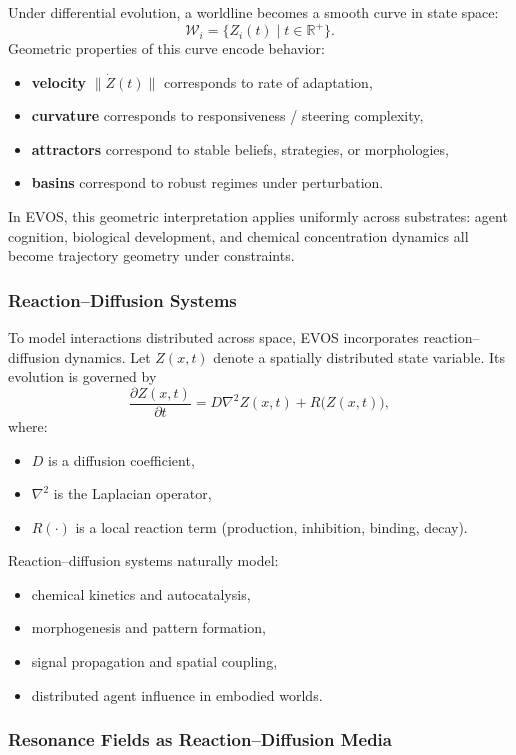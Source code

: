 \documentclass[11pt]{article}
\begin{document}
Under differential evolution, a worldline becomes a smooth curve in state space:
\[
\mathcal{W}_i = \{ Z_i(t) \mid t \in \mathbb{R}^+ \}.
\]
Geometric properties of this curve encode behavior:
\begin{itemize}
  \item \textbf{velocity} $\|\dot{Z}(t)\|$ corresponds to rate of adaptation,
  \item \textbf{curvature} corresponds to responsiveness / steering complexity,
  \item \textbf{attractors} correspond to stable beliefs, strategies, or morphologies,
  \item \textbf{basins} correspond to robust regimes under perturbation.
\end{itemize}

In EVOS, this geometric interpretation applies uniformly across substrates:
agent cognition, biological development, and chemical concentration dynamics all become
trajectory geometry under constraints.

\subsubsection{Reaction--Diffusion Systems}

To model interactions distributed across space, EVOS incorporates reaction--diffusion
dynamics. Let $Z(x,t)$ denote a spatially distributed state variable. Its evolution is
governed by
\[
\frac{\partial Z(x,t)}{\partial t}
=
D \nabla^2 Z(x,t) + R\!\big(Z(x,t)\big),
\]
where:
\begin{itemize}
  \item $D$ is a diffusion coefficient,
  \item $\nabla^2$ is the Laplacian operator,
  \item $R(\cdot)$ is a local reaction term (production, inhibition, binding, decay).
\end{itemize}

Reaction--diffusion systems naturally model:
\begin{itemize}
  \item chemical kinetics and autocatalysis,
  \item morphogenesis and pattern formation,
  \item signal propagation and spatial coupling,
  \item distributed agent influence in embodied worlds.
\end{itemize}

\subsubsection{Resonance Fields as Reaction--Diffusion Media}
\end{document}

